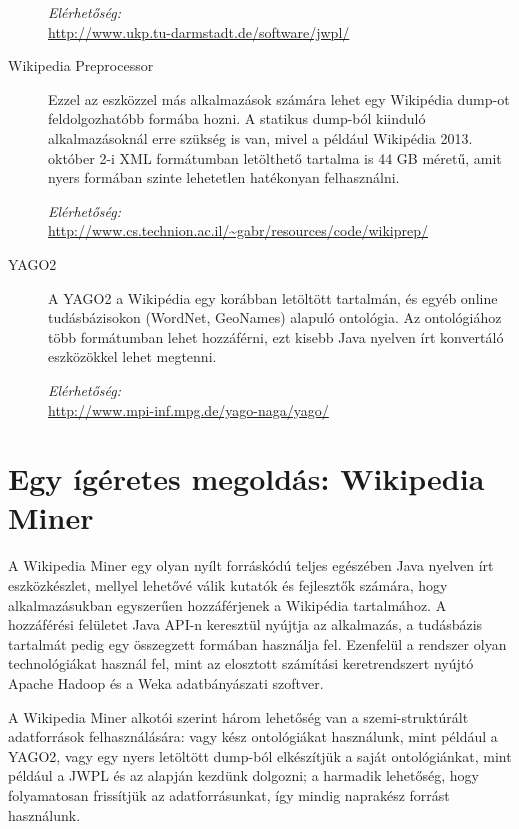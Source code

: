 \begin{description}
\textit{Elérhetőség:}\\
\url{http://www.ukp.tu-darmstadt.de/software/jwpl/}

\item[Wikipedia Preprocessor] Ezzel az eszközzel más alkalmazások számára lehet egy Wikipédia dump-ot feldolgozhatóbb formába hozni. A statikus dump-ból kiinduló alkalmazásoknál erre szükség is van, mivel a például Wikipédia 2013. október 2-i XML formátumban letölthető tartalma is 44 GB méretű, amit nyers formában szinte lehetetlen hatékonyan felhasználni.
	
\textit{Elérhetőség:}\\
\url{http://www.cs.technion.ac.il/~gabr/resources/code/wikiprep/}

\item[YAGO2\cite{yago2}] A YAGO2 a Wikipédia egy korábban letöltött tartalmán, és egyéb online tudásbázisokon (WordNet, GeoNames) alapuló ontológia. Az ontológiához több formátumban lehet hozzáférni, ezt kisebb Java nyelven írt konvertáló eszközökkel lehet megtenni.
	
\textit{Elérhetőség:}\\
\url{http://www.mpi-inf.mpg.de/yago-naga/yago/}
\end{description}

\section{Egy ígéretes megoldás: Wikipedia Miner}
\label{sec:wikipediaminer}

A Wikipedia Miner egy olyan nyílt forráskódú teljes egészében Java nyelven írt eszközkészlet, mellyel lehetővé válik kutatók és fejlesztők számára, hogy alkalmazásukban egyszerűen hozzáférjenek a Wikipédia tartalmához. A hozzáférési felületet Java API-n keresztül nyújtja az alkalmazás, a tudásbázis tartalmát pedig egy összegzett formában használja fel. Ezenfelül a rendszer olyan technológiákat használ fel, mint az elosztott számítási keretrendszert nyújtó Apache Hadoop és a Weka adatbányászati szoftver.

A Wikipedia Miner alkotói szerint három lehetőség van a szemi-struktúrált adatforrások felhasználására: vagy kész ontológiákat használunk, mint például a YAGO2, vagy egy nyers letöltött dump-ból elkészítjük a saját ontológiánkat, mint például a JWPL és az alapján kezdünk dolgozni; a harmadik lehetőség, hogy folyamatosan frissítjük az adatforrásunkat, így mindig naprakész forrást használunk.

